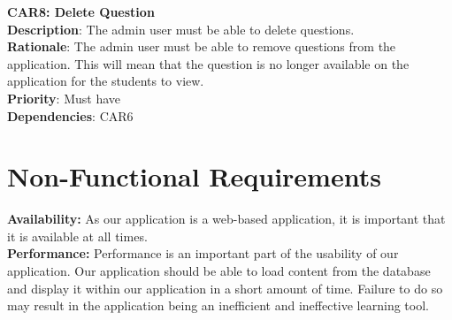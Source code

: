 \documentclass{l3proj}
\begin{document}
\textbf{CAR8: Delete Question}\\
\textbf{Description}: The admin user must be able to delete questions. \\
\textbf{Rationale}:  The admin user must be able to remove questions from the application. This will mean that the question is no longer available on the application for the students to view.\\
\textbf{Priority}: Must have\\
\textbf{Dependencies}: CAR6\\

\section{Non-Functional Requirements}

\textbf{Availability:}
As our application is a web-based application, it is important that it is available at all times. \\

\textbf{ Performance:}
Performance is an important part of the usability of our application. Our application should be able to load content from the database and display it within our application in a short amount of time. Failure to do so may result in the application being an inefficient and ineffective learning tool.\\
\end{document}
